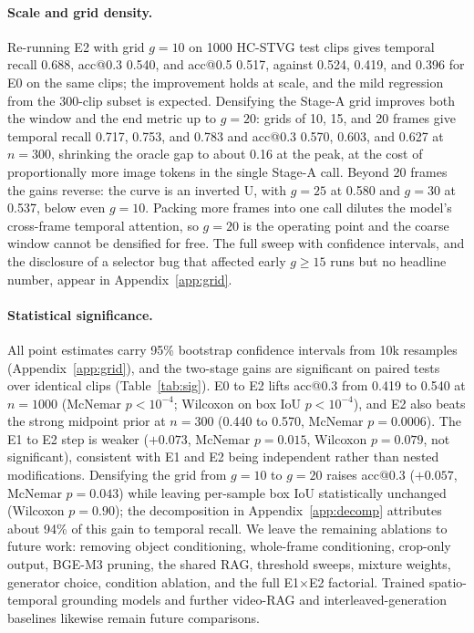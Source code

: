 \paragraph{Scale and grid density.}
Re-running E2 with grid $g=10$ on 1000 HC-STVG test clips gives temporal recall 0.688, acc@0.3 0.540, and acc@0.5 0.517, against 0.524, 0.419, and 0.396 for E0 on the same clips; the improvement holds at scale, and the mild regression from the 300-clip subset is expected. Densifying the Stage-A grid improves both the window and the end metric up to $g=20$: grids of 10, 15, and 20 frames give temporal recall 0.717, 0.753, and 0.783 and acc@0.3 0.570, 0.603, and 0.627 at $n=300$, shrinking the oracle gap to about 0.16 at the peak, at the cost of proportionally more image tokens in the single Stage-A call. Beyond 20 frames the gains reverse: the curve is an inverted U, with $g=25$ at 0.580 and $g=30$ at 0.537, below even $g=10$. Packing more frames into one call dilutes the model's cross-frame temporal attention, so $g=20$ is the operating point and the coarse window cannot be densified for free. The full sweep with confidence intervals, and the disclosure of a selector bug that affected early $g\ge 15$ runs but no headline number, appear in Appendix~\ref{app:grid}.

\paragraph{Statistical significance.}
All point estimates carry 95\% bootstrap confidence intervals from 10k resamples (Appendix~\ref{app:grid}), and the two-stage gains are significant on paired tests over identical clips (Table~\ref{tab:sig}). E0 to E2 lifts acc@0.3 from 0.419 to 0.540 at $n=1000$ (McNemar $p<10^{-4}$; Wilcoxon on box IoU $p<10^{-4}$), and E2 also beats the strong midpoint prior at $n=300$ (0.440 to 0.570, McNemar $p=0.0006$). The E1 to E2 step is weaker ($+0.073$, McNemar $p=0.015$, Wilcoxon $p=0.079$, not significant), consistent with E1 and E2 being independent rather than nested modifications. Densifying the grid from $g=10$ to $g=20$ raises acc@0.3 ($+0.057$, McNemar $p=0.043$) while leaving per-sample box IoU statistically unchanged (Wilcoxon $p=0.90$); the decomposition in Appendix~\ref{app:decomp} attributes about 94\% of this gain to temporal recall. We leave the remaining ablations to future work: removing object conditioning, whole-frame conditioning, crop-only output, BGE-M3 pruning, the shared RAG, threshold sweeps, mixture weights, generator choice, condition ablation, and the full E1$\times$E2 factorial. Trained spatio-temporal grounding models and further video-RAG and interleaved-generation baselines \citep{videorag2411,m2rag2411} likewise remain future comparisons.

